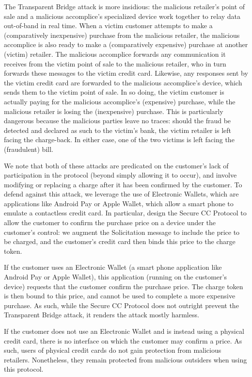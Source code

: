 The Transparent Bridge attack is more insidious:
    the malicious retailer's point of sale and a malicious accomplice's specialized device work together to relay data out-of-band in real time.
When a victim customer attempts to make a (comparatively inexpensive) purchase from the malicious retailer,
    the malicious accomplice is also ready to make a (comparatively expensive) purchase at another (victim) retailer.
The malicious accomplice forwards any communication it receives from the victim point of sale to the malicious retailer,
    who in turn forwards these messages to the victim credit card.
Likewise, any responses sent by the victim credit card are forwarded to the malicious accomplice's device, which sends them to the victim point of sale.
In so doing, the victim customer is actually paying for the malicious accomplice's (expensive) purchase, while the malicious retailer is losing the (inexpensive) purchase.
This is particularly dangerous because the malicious parties leave no traces:
    should the fraud be detected and declared as such to the victim's bank, the victim retailer is left facing the charge-back.
In either case, one of the two victims is left facing the (fraudulent) bill.

We note that both of these attacks are predicated on the customer's lack of participation in the protocol (beyond simply allowing it to occur),
    and involve modifying or replacing a charge after it has been confirmed by the customer.
To defend against this attack, we leverage the use of Electronic Wallets, which are applications like Android Pay or Apple Wallet, which allow a smart phone to emulate a contactless credit card.
In particular, design the Secure CC Protocol to allow the customer to confirm the purchase price on a device under the customer's control:
    we augment the Solicitation message to include the price to be charged, and the customer's credit card then binds this price to the charge token.

If the customer uses an Electronic Wallet (a smart phone application like Android Pay or Apple Wallet),
    this application (running on the customer's device) requests that the customer confirm the purchase price.
The charge token is then bound to this price, and cannot be used to complete a more expensive purchase.
As such, while the Secure CC Protocol does not outright prevent the Transparent Bridge attack, it renders the attack mostly harmless.

If the customer does not use an Electronic Wallet and is instead using a physical credit card,
    there is no interface on which the customer may confirm a price.
As such, users of physical credit cards do not gain protection from malicious retailers.
Nonetheless, they remain protected from malicious outsiders when using this protocol.

